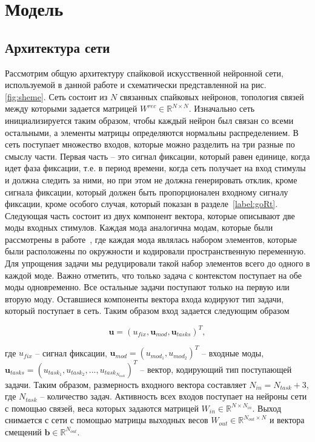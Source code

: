 \documentclass{article}
\begin{document}
\section{Модель}
\subsection{Архитектура сети}

Рассмотрим общую архитектуру спайковой искусственной нейронной сети, используемой в данной работе и схематически представленной на рис. \ref{fig:sheme}. Сеть состоит из $N$ связанных спайковых нейронов, топология связей между которыми задается матрицей $W^{rec} \in \mathbb{R}^{N \times N}$. Изначально сеть инициализируется таким образом, чтобы каждый нейрон был связан со всеми остальными, а элементы матрицы определяются нормальны распределением. В сеть поступает множество входов, которые можно разделить на три разные по смыслу части. Первая часть -- это сигнал фиксации, который равен единице, когда идет фаза фиксации, т.е. в период времени, когда сеть получает на вход стимулы и должна следить за ними, но при этом не должна генерировать отклик, кроме сигнала фиксации, который должен быть пропорционален входному сигналу фиксации, кроме особого случая, который показан в разделе~\ref{label:goRt}. Следующая часть состоит из двух компонент вектора, которые описывают две моды входных стимулов. Каждая мода аналогична модам, которые были рассмотрены в работе~\cite{yang2019task}, где каждая мода являлась набором элементов, которые были расположены по окружности и кодировали пространственную переменную. Для упрощения задачи мы редуцировали такой набор элементов всего до одного в каждой моде. Важно отметить, что только задача с контекстом поступает на обе моды одновременно. Все остальные задачи поступают только на первую или вторую моду. Оставшиеся компоненты вектора входа кодируют тип задачи, который поступает в сеть. Таким образом вход задается следующим образом

\begin{equation} \label{eq:inputs}
  \mathbf{u} = (u_{fix}, \mathbf{u}_{mod}, \mathbf{u}_{tasks})^T,
\end{equation}

где $u_{fix}$ -- сигнал фиксации, $\mathbf{u}_{mod} = (u_{mod_1}, u_{mod_2})^T$ -- входные моды,
$\mathbf{u}_{tasks} = (u_{task_1}, u_{task_2}, ..., u_{task_{N_{task}}})^T$ -- вектор, кодирующий тип поступающей задачи. Таким образом, размерность входного вектора составляет  $N_{in} = N_{task} + 3$, где $N_{task}$ -- количество задач. Активность всех входов поступает на нейроны сети с помощью связей, веса которых задаются матрицей $W_{in} \in \mathbb{R}^{N \times N_{in}}$. Выход снимается с сети с помощью матрицы выходных весов $W_{out} \in \mathbb{R}^{N_{out} \times N}$ и вектора смещений $\mathbf{b} \in \mathbb{R}^{N_{out}}$.
\end{document}
